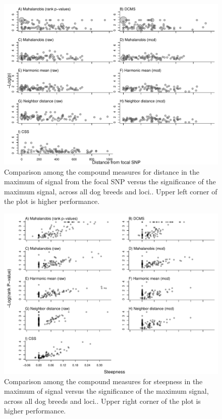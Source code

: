 \documentclass[12pt, oneside]{amsart}
\begin{document}
\newpage
\begin{figure}[h]
\begin{center}
\includegraphics[width=6in]{../figures_man2/S7-Dog_ScatterCompareDistanceAndEmp_AllMulti.pdf}
\end{center}
\caption[]{Comparison among the compound measures for distance in the maximum of signal from the focal SNP versus the significance of the maximum signal, across all dog breeds and loci.. Upper left corner of the plot is higher performance.}
 \label{fig:???}
\end{figure}

\newpage
\begin{figure}[h]
\begin{center}
\includegraphics[width=6in]{../figures_man2/S8-Dog_ScatterCompareSteepnessAndEmp_AllMulti.pdf}
\end{center}
\caption[]{Comparison among the compound measures for steepness in the maximum of signal versus the significance of the maximum signal, across all dog breeds and loci.. Upper right corner of the plot is higher performance.}
 \label{fig:???}
\end{figure}
\end{document}
